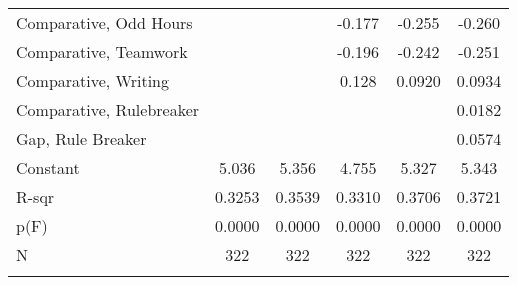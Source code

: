 {\begin{center}
{\begin{longtable}{l*{5}{c}}
\addlinespace
Comparative, Odd Hours&                     &                     &      -0.177\sym{*}  &      -0.255\sym{***}&      -0.260\sym{***}\\
\addlinespace
Comparative, Teamwork    &                     &                     &      -0.196\sym{*}  &      -0.242\sym{**} &      -0.251\sym{**} \\
\addlinespace
Comparative, Writing &                     &                     &       0.128         &      0.0920         &      0.0934         \\
\addlinespace
Comparative, Rulebreaker &                     &                     &                     &                     &      0.0182         \\
\addlinespace
Gap, Rule Breaker        &                     &                     &                     &                     &      0.0574         \\
\addlinespace
Constant                 &       5.036\sym{***}&       5.356\sym{***}&       4.755\sym{***}&       5.327\sym{***}&       5.343\sym{***}\\
\midrule
R-sqr                    &      0.3253         &      0.3539         &      0.3310         &      0.3706         &      0.3721         \\
p(F)                     &      0.0000         &      0.0000         &      0.0000         &      0.0000         &      0.0000         \\
N                        &         322         &         322         &         322         &         322         &         322         \\
\hline
\addlinespace
\multicolumn{6}{l}{\footnotesize \sym{*} \(p<0.10\), \sym{**} \(p<0.05\), \sym{***} \(p<.01\)}\\

\end{longtable}
}
\end{center}
}

